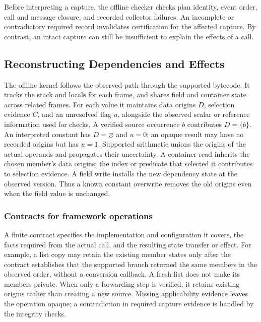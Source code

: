 Before interpreting a capture, the offline checker checks plan identity,
event order, call and message closure, and recorded collector failures.
An incomplete or contradictory required record invalidates certification
for the affected capture. By contrast, an intact capture can still be
insufficient to explain the effects of a call.

\subsection{Reconstructing Dependencies and Effects}
\label{sec:method-kernel}

The offline kernel follows the observed path through the supported
bytecode. It tracks the stack and locals for each frame, and shares
field and container state across related frames. For each value it maintains
data origins $D$, selection evidence $C$, and an unresolved flag $u$,
alongside the observed scalar or reference information used for checks.
A verified source occurrence $b$ contributes $D=\{b\}$. An interpreted
constant has $D=\varnothing$ and $u=0$; an opaque result may have no
recorded origins but has $u=1$. Supported arithmetic unions the origins
of the actual operands and propagates their uncertainty. A container
read inherits the chosen member's data origins; the index or predicate
that selected it contributes to selection evidence. A field write installs
the new dependency state at the observed version. Thus a known constant
overwrite removes the old origins even when the field value is unchanged.

\subsubsection{Contracts for framework operations}
\label{sec:method-effects}

A finite contract specifies the implementation and configuration it covers,
the facts required from the actual call, and the resulting state transfer
or effect. For example, a list copy may retain the existing member states
only after the contract establishes that the supported branch returned
the same members in the observed order, without a conversion callback.
A fresh list does not make its members private. When only a forwarding
step is verified, it retains existing origins rather than creating a new
source. Missing applicability evidence leaves the operation opaque; a
contradiction in required capture evidence is handled by the integrity
checks.

